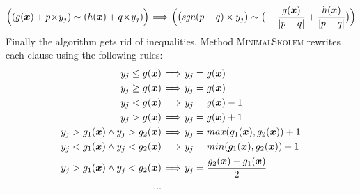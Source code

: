\begin{equation}
{\Big( (g(\vx)+ p\!\times\!y_j}) \sim ( {h(\vx) + q\!\times\!y_j})\Big) \!\implies\! \Big(\big(\mathit{sgn}(p-q)\times y_j \big) \sim \big( -\frac{g(\vx)}{|p-q|} + \frac{h(\vx)}{|p-q|} \big)\Big)  \notag
\end{equation}
Finally the algorithm gets rid of inequalities.
Method \textsc{MinimalSkolem} rewrites each clause using the following rules:
\begin{align}
     y_j \le g (\vx) &\!\implies\! y_j = g (\vx)  \notag \\
     y_j \ge g (\vx) &\!\implies\! y_j = g (\vx)  \notag \\
     y_j < g (\vx) &\!\implies\! y_j = g (\vx) - 1 \notag \\
     y_j > g (\vx) &\!\implies\! y_j = g (\vx) + 1  \notag \\
     y_j > g_1 (\vx) \land y_j > g_2 (\vx) &\!\implies\! y_j = max(g_1 (\vx), g_2(\vx)) + 1  \notag \\
     y_j < g_1 (\vx) \land y_j < g_2 (\vx) &\!\implies\! y_j = min(g_1 (\vx), g_2(\vx)) - 1  \notag \\
     y_j > g_1 (\vx) \land y_j < g_2 (\vx) &\!\implies\! y_j = \frac{g_2 (\vx) - g_1(\vx)} {2}  \notag \\
     ...
\end{align}



